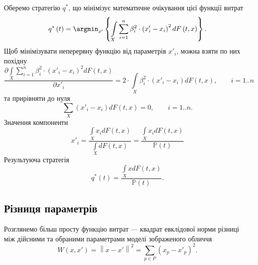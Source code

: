 Оберемо стратегію $q^*$,
що мінімізує математичне очікування цієї функції витрат
\begin{equation*}
  q^* \left( t \right)
  = \argmin_{x'} \left\{
    \int\limits_{X}
        \sum_{i = 1}^n \beta_i^2 \cdot \left( x'_i - x_i \right)^2
        dF\left( t, x \right)
    \right\}.
\end{equation*}
Щоб мінімізувати неперервну функцію від параметрів $x'_i$,
можна взяти по них похідну
\begin{equation*}
  \frac{\partial \int\limits_{X}
      \sum\limits_{i = 1}^n \beta_i^2 \cdot \left( x'_i - x_i \right)^2
      dF\left( t, x \right)
  }{\partial x'_i}
  = 2 \cdot \int\limits_{X}
    \beta_i^2 \cdot \left( x'_i - x_i \right) dF\left( t, x \right),
    \qquad i = 1..n
\end{equation*}
та прирівняти до нуля
\begin{equation*}
  \sum_{X} \left( x'_i - x_i \right) dF\left( t, x \right) = 0,
  \qquad i = 1..n.
\end{equation*}
Значення компоненти
\begin{equation*}
  x'_i
  = \frac{\int\limits_{X} x_i dF\left( t, x \right)}
         {\int\limits_{X} dF\left( t, x \right)}
  = \frac{\int\limits_{X} x_i dF\left( t, x \right)}
         {\mathbb{P}\left( t \right)}
\end{equation*}
Результуюча стратегія
\begin{equation*}
  q^*\left( t \right)
  = \frac{\int\limits_{X} x dF\left( t, x \right)}{\mathbb{P}\left( t \right)}.
\end{equation*}

\subsection{Різниця параметрів}

Розглянемо більш просту функцію витрат ---
квадрат евклідової норми різниці між дійсними та обраними параметрами
моделі зображеного обличчя
\begin{equation*}
  W \left( x, x' \right)
  = \left\| x - x' \right\|^2
  = \sum_{p \in P} \left( x_p - x'_p \right)^2.
\end{equation*}


